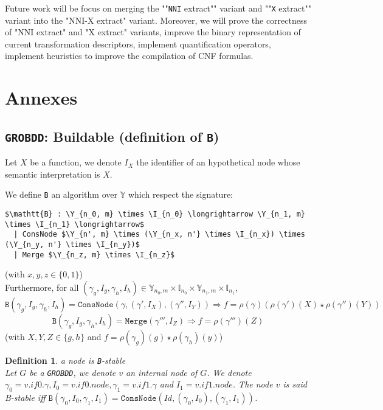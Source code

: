 \documentclass[a4paper,10pt]{article}
\newcommand{\Y}{\mathbb{Y}}
\newcommand{\I}{\mathbb{I}}
\newcommand{\nniextract}{"\texttt{NNI} extract"}
\newcommand{\xextract}{"\texttt{X} extract"}
\newcommand{\GroBdd}{\texttt{GROBDD}}
\newtheorem{newdef}{Definition}
\newcommand{\definition}[2]{\begin{newdef}{#1\\}#2\end{newdef}}
\begin{document}
Future work will be focus on merging the "\nniextract{}" variant and "\xextract{}" variant into the "NNI-X extract" variant.
Moreover, we will prove the correctness of "NNI extract" and "X extract" variants, improve the binary representation of current transformation descriptors, implement quantification operators, implement heuristics to improve the compilation of CNF formulas.


\newpage
{}


\newpage
\tableofcontents

\newpage

\section{Annexes}

\subsection{\GroBdd{}: Buildable (definition of \texttt{B})\label{grobdd-B-constraints}}

Let $X$ be a function, we denote $I_X$ the identifier of an hypothetical node whose semantic interpretation is $X$.

We define \texttt{B} an algorithm over $\Y$ which respect the signature:
\begin{lstlisting}
$\mathtt{B} : \Y_{n_0, m} \times \I_{n_0} \longrightarrow \Y_{n_1, m} \times \I_{n_1} \longrightarrow$
  | ConsNode $\Y_{n', m} \times (\Y_{n_x, n'} \times \I_{n_x}) \times (\Y_{n_y, n'} \times \I_{n_y})$
  | Merge $\Y_{n_z, m} \times \I_{n_z}$
\end{lstlisting}
(with $x, y, z \in \{0, 1\}$) \\
Furthermore, for all $(\gamma_g, I_g, \gamma_h, I_h) \in \Y_{n_0, m} \times \I_{n_0} \times \Y_{n_1, m} \times \I_{n_1}$, 
\[ \texttt{B}(\gamma_g, I_g, \gamma_h, I_h) = \texttt{ConsNode} (\gamma, (\gamma', I_X), (\gamma'', I_Y)) \Rightarrow f = \rho\left(\gamma\right) \left(\rho\left(\gamma'\right)(X) \star \rho\left(\gamma''\right)(Y)\right)\]
\[ \texttt{B}(\gamma_g, I_g, \gamma_h, I_h) = \texttt{Merge} (\gamma''', I_Z) \Rightarrow f = \rho(\gamma''')(Z) \]
(with $X, Y, Z \in\{g, h\}$ and $f = \rho(\gamma_g)(g) \star \rho(\gamma_h)(y)$)

\definition{a node is \texttt{B}-stable}
{Let $G$ be a \GroBdd{}, we denote $v$ an internal node of $G$.
We denote $\gamma_0 = v.if0.\gamma, I_0 = v.if0.node, \gamma_1 = v.if1.\gamma$ and $I_1 = v.if1.node$.
The node $v$ is said B-stable iff $\mathtt{B}(\gamma_0, I_0, \gamma_1, I_1) = \mathtt{ConsNode}(Id, (\gamma_0, I_0), (\gamma_1, I_1))$.
}
\end{document}
